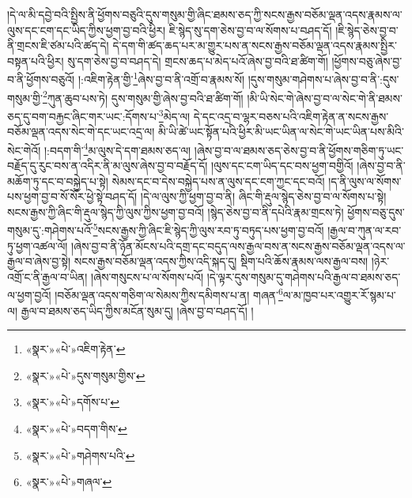 །དེ་ལ་མི་དབྱེ་བའི་སྤྱིས་ནི་ཕྱོགས་བཅུའི་དུས་གསུམ་གྱི་ཞིང་ཐམས་ཅད་ཀྱི་སངས་རྒྱས་བཅོམ་ལྡན་འདས་རྣམས་ལ་ལུས་དང་ངག་དང་ཡིད་ཀྱིས་ཕྱག་བྱ་བའི་ཕྱིར། ཇི་སྙེད་སུ་དག་ཅེས་བྱ་བ་ལ་སོགས་པ་བཤད་དོ། །ཇི་སྙེད་ཅེས་བྱ་བ་ནི་གྲངས་ཇི་ཙམ་པའི་ཚད་དེ། དེ་དག་གི་ཚད་ཆད་པར་མ་གྱུར་པས་ན་སངས་རྒྱས་བཅོམ་ལྡན་འདས་རྣམས་སྤྱིར་བསྟན་པའི་ཕྱིར། སུ་དག་ཅེས་བྱ་བ་བཤད་དེ། གྲངས་ཆད་པ་མེད་པའོ་ཞེས་བྱ་བའི་ཐ་ཚིག་གོ། །ཕྱོགས་བཅུ་ཞེས་བྱ་བ་ནི་ཕྱོགས་བཅུའོ། །:འཇིག་རྟེན་གྱི་\footnote{«སྣར་»«པེ་»འཇིག་རྟེན་}ཞེས་བྱ་བ་ནི་འགྲོ་བ་རྣམས་སོ། །དུས་གསུམ་གཤེགས་པ་ཞེས་བྱ་བ་ནི་:དུས་གསུམ་གྱི་\footnote{«སྣར་»«པེ་»དུས་གསུམ་གྱིས་}ཀུན་ཆུབ་པས་ཏེ། དུས་གསུམ་གྱི་ཞེས་བྱ་བའི་ཐ་ཚིག་གོ། །མི་ཡི་སེང་གེ་ཞེས་བྱ་བ་ལ་སེང་གེ་ནི་ཐམས་ཅད་དུ་བག་བརྐྱང་ཞིང་གར་ཡང་:དོགས་པ་\footnote{«སྣར་»«པེ་»དགོས་པ་}མེད་ལ། དེ་དང་འདྲ་བ་ལྷར་བཅས་པའི་འཇིག་རྟེན་ན་སངས་རྒྱས་བཅོམ་ལྡན་འདས་སེང་གེ་དང་ཡང་འདྲ་ལ། མི་ཡི་ཚེ་ཡང་སྟོན་པའི་ཕྱིར་མི་ཡང་ཡིན་ལ་སེང་གེ་ཡང་ཡིན་པས་མིའི་སེང་གེའོ། །:བདག་གི་\footnote{«སྣར་»«པེ་»བདག་གིས་}མ་ལུས་དེ་དག་ཐམས་ཅད་ལ། །ཞེས་བྱ་བ་ལ་ཐམས་ཅད་ཅེས་བྱ་བ་ནི་ཕྱོགས་གཅིག་ཏུ་ཡང་བརྗོད་དུ་རུང་བས་ན་འདིར་ནི་མ་ལུས་ཞེས་བྱ་བ་བརྗོད་དོ། །ལུས་དང་ངག་ཡིད་དང་བས་ཕྱག་བགྱིའོ། །ཞེས་བྱ་བ་ནི་མཆོག་ཏུ་དང་བ་བསྐྱེད་པ་སྟེ། སེམས་དང་བ་དེས་བསྐྱེད་པས་ན་ལུས་དང་ངག་ཀྱང་དང་བའོ། །ད་ནི་ལུས་ལ་སོགས་པས་ཕྱག་བྱ་བ་སོ་སོར་ཕྱེ་སྟེ་བཤད་དོ། །དེ་ལ་ལུས་ཀྱི་ཕྱག་བྱ་བ་ནི། ཞིང་གི་རྡུལ་སྙེད་ཅེས་བྱ་བ་ལ་སོགས་པ་སྟེ། སངས་རྒྱས་ཀྱི་ཞིང་གི་རྡུལ་སྙེད་ཀྱི་ལུས་ཀྱིས་ཕྱག་བྱ་བའོ། །སྙེད་ཅེས་བྱ་བ་ནི་དཔེའི་རྣམ་གྲངས་ཏེ། ཕྱོགས་བཅུ་དུས་གསུམ་དུ་:གཤེགས་པའོ་\footnote{«སྣར་»«པེ་»གཤེགས་པའི་}སངས་རྒྱས་ཀྱི་ཞིང་ཇི་སྙེད་ཀྱི་ལུས་རབ་ཏུ་བཏུད་པས་ཕྱག་བྱ་བའོ། །རྒྱལ་བ་ཀུན་ལ་རབ་ཏུ་ཕྱག་འཚལ་ལོ། །ཞེས་བྱ་བ་ནི་ཉོན་མོངས་པའི་དགྲ་དང་བདུད་ལས་རྒྱལ་བས་ན་སངས་རྒྱས་བཅོམ་ལྡན་འདས་ལ་རྒྱལ་བ་ཞེས་བྱ་སྟེ། སངས་རྒྱས་བཅོམ་ལྡན་འདས་ཀྱིས་འདི་སྐད་དུ། སྡིག་པའི་ཆོས་རྣམས་ལས་རྒྱལ་བས། །ཉེར་འགྲོ་ང་ནི་རྒྱལ་བ་ཡིན། །ཞེས་གསུངས་པ་ལ་སོགས་པའོ། །དེ་ལྟར་དུས་གསུམ་དུ་གཤེགས་པའི་རྒྱལ་བ་ཐམས་ཅད་ལ་ཕྱག་བྱའོ། །བཅོམ་ལྡན་འདས་གཅིག་ལ་སེམས་ཀྱིས་དམིགས་པ་ན། གཞན་\footnote{«སྣར་»«པེ་»གཞལ་}ལ་མ་ཁྱབ་པར་འགྱུར་རོ་སྙམ་པ་ལ། རྒྱལ་བ་ཐམས་ཅད་ཡིད་ཀྱིས་མངོན་སུམ་དུ། །ཞེས་བྱ་བ་བཤད་དོ། །

